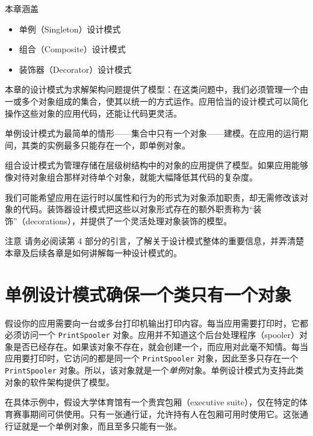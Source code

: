 \begin{myChapterIntro}{本章涵盖}
\begin{itemize}
\item 单例（Singleton）设计模式
\item 组合（Composite）设计模式
\item 装饰器（Decorator）设计模式
\end{itemize}
\end{myChapterIntro}

本章的设计模式为求解架构问题提供了模型：在这类问题中，我们必须管理一个由一或多个对象组成的集合，使其以统一的方式运作。应用恰当的设计模式可以简化操作这些对象的应用代码，还能让代码更灵活。


单例设计模式为最简单的情形——集合中只有一个对象——建模。在应用的运行期间，其类的实例最多只能存在一个，即单例对象。

组合设计模式为管理存储在层级树结构中的对象的应用提供了模型。如果应用能够像对待对象组合那样对待单个对象，就能大幅降低其代码的复杂度。

我们可能希望应用在运行时以属性和行为的形式为对象添加职责，却无需修改该对象的代码。装饰器设计模式把这些以对象形式存在的额外职责称为“装饰”（decorations），并提供了一个灵活处理对象装饰的模型。

\begin{myWarning}{注意}
请务必阅读第 4 部分的引言，了解关于设计模式整体的重要信息，并弄清楚本章及后续各章是如何讲解每一种设计模式的。
\end{myWarning}

\section{单例设计模式确保一个类只有一个对象}

假设你的应用需要向一台或多台打印机输出打印内容。每当应用需要打印时，它都必须访问一个 \texttt{Print\allowbreak{}Spooler} 对象。应用并不知道这个后台处理程序（spooler）对象是否已经存在。如果该对象不存在，就会创建一个，而应用对此毫不知情。每当应用要打印时，它访问的都是同一个 \texttt{Print\allowbreak{}Spooler} 对象，因此至多只存在一个 \texttt{Print\allowbreak{}Spooler} 对象。所以，该对象就是一个\emph{单例}对象。单例设计模式为支持此类对象的软件架构提供了模型。

在具体示例中，假设大学体育馆有一个贵宾包厢（executive suite），仅在特定的体育赛事期间可供使用。只有一张通行证，允许持有人在包厢可用时使用它。这张通行证就是一个单例对象，而且至多只能有一张。

